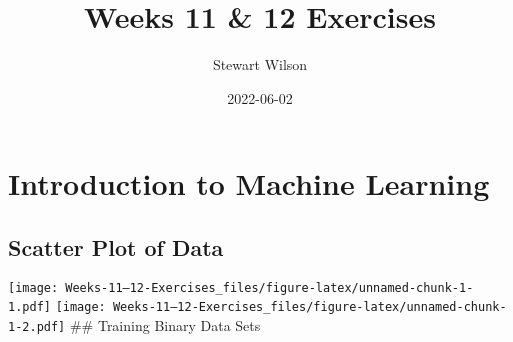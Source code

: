 \documentclass[
]{article}
\title{Weeks 11 \& 12 Exercises}
\author{Stewart Wilson}
\date{2022-06-02}
\begin{document}
\maketitle

\hypertarget{introduction-to-machine-learning}{%
\section{Introduction to Machine
Learning}\label{introduction-to-machine-learning}}

\hypertarget{scatter-plot-of-data}{%
\subsection{Scatter Plot of Data}\label{scatter-plot-of-data}}

\texttt{[image: Weeks-11---12-Exercises\_files/figure-latex/unnamed-chunk-1-1.pdf]}
\texttt{[image: Weeks-11---12-Exercises\_files/figure-latex/unnamed-chunk-1-2.pdf]}
\#\# Training Binary Data Sets
\end{document}
